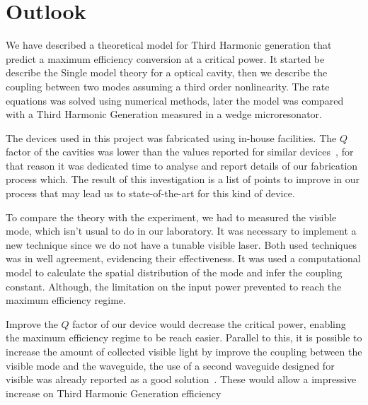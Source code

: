 \chapter{Outlook}
\label{chap:7_outlook}

We have described a theoretical model for Third Harmonic generation that predict a maximum efficiency conversion at a critical power. It started be describe the Single model theory for a optical cavity, then we describe the coupling between two modes assuming a third order nonlinearity. The rate equations was solved using numerical methods, later the model was compared with a Third Harmonic Generation measured in a wedge microresonator. 

The devices  used in this project was fabricated using in-house facilities. The $Q$ factor of the cavities was lower than the values reported for similar devices~\cite{Lee2012}, for that reason it was dedicated time to analyse and report details of our fabrication process which. The result of this investigation is a list of points to improve in our process that may lead us to state-of-the-art for this kind of device.

To compare the theory with the experiment, we had to measured the visible mode, which isn't usual to do in our laboratory. It was necessary to implement a new technique since we do not have a tunable visible laser. Both used techniques was in well agreement, evidencing their effectiveness. It was used a computational model to calculate the spatial distribution of the mode and infer the coupling constant. Although, the limitation on the input power prevented to reach the maximum efficiency regime.  

Improve the $Q$ factor of our device would decrease the critical power, enabling the maximum efficiency regime to be reach easier. Parallel to this, it is possible to increase the amount of collected visible light by improve the coupling between the visible mode and the waveguide, the use of a second waveguide designed for visible was already reported as a good solution~\cite{Surya17}. These would allow a impressive increase on Third Harmonic Generation efficiency~\cite{Rodriguz2007}